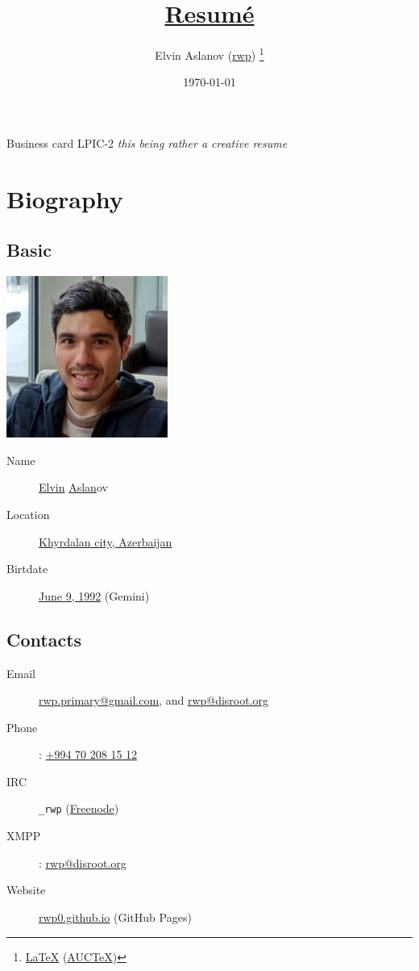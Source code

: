 \documentclass {article}
\title {\href{https://github.com/rwp0/resume}{Resumé}}
\author {Elvin Aslanov (\href{https://rwp0.github.io/}{rwp}) \thanks{\href{https://en.wikipedia.org/wiki/LaTeX}{\LaTeX} (\href{https://www.gnu.org/software/auctex/}{AUCTeX})}}
\date {\today}
\begin{document}
  \begin {titlepage}
    \maketitle
  \end {titlepage}
   {Business card}
   {LPIC-2}
  \textit {this being rather a creative resume}

  \section {Biography}

    \subsection {Basic}
    \includegraphics [scale = 0.5] {resume.jpg}
      \begin {description}
      \item [Name] \href{https://en.wiktionary.org/wiki/Elvin}{Elvin} \href{https://en.wiktionary.org/wiki/Aslan}{Aslan}ov
        \item [Location] \href{https://www.openstreetmap.org/way/186275017}{Khyrdalan city, Azerbaijan}
        \item [Birtdate] \href{https://www.timeanddate.com/date/durationresult.html?m1=06&d1=09&y1=1992}{June 9, 1992} (Gemini)
      \end {description}

     \subsection{Contacts}
       \begin{description}
         \item[Email] \href{mailto:rwp.primary@gmail.com}{rwp.primary@gmail.com}, and \href{mailto:rwp@disroot.org}{rwp@disroot.org}
         \item[Phone]: \href{tel:+994702081512}{+994 70 208 15 12}
         \item[IRC] \verb|_rwp| (\href{https://freenode.net/}{Freenode})
         \item[XMPP]: \url{rwp@disroot.org}
         \item[Website] \href{https://rwp0.github.io/}{rwp0.github.io} (GitHub Pages)
       \end{description}
\end{document}
